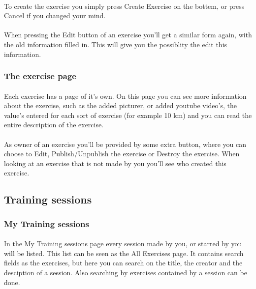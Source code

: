 \documentclass[11pt,a4paper]{scrartcl}
\begin{document}
\paragraph{}To create the exercise you simply press Create Exercise on the bottem, or press Cancel if you changed your mind.
\paragraph{}When pressing the Edit button of an exercise you'll get a similar form again, with the old information filled in. This will give you the possiblity the edit this information.

\subsubsection{The exercise page}
\paragraph{}Each exercise has a page of it's own. On this page you can see more information about the exercise, such as the added picturer, or added youtube video's, the value's entered for each sort of exercise (for example 10 km) and you can read the entire description of the exercise.
\paragraph{}As owner of an exercise you'll be provided by some extra button, where you can choose to Edit, Publish/Unpublish the exercise or Destroy the exercise. When looking at an exercise that is not made by you you'll see who created this exercise.

\subsection{Training sessions}
\subsubsection{My Training sessions}
\paragraph{}In the My Training sessions page every session made by you, or starred by you will be listed. This list can be seen as the All Exercises page. It contains search fields as the exercises, but here you can search on the title, the creator and the desciption of a session. Also searching by exercises contained by a session can be done.
\end{document}
